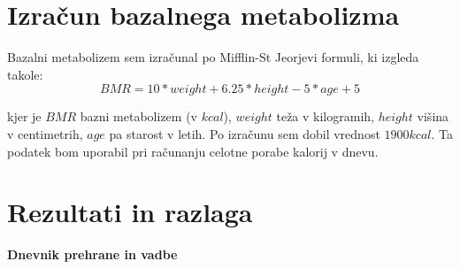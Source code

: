 \documentclass{article}
\begin{document}
\section{Izračun bazalnega metabolizma}
Bazalni metabolizem sem izračunal po Mifflin-St Jeorjevi formuli, ki izgleda takole:
\[
BMR = 10 * weight + 6.25 * height - 5 * age + 5 
\]

kjer je $BMR$ bazni metabolizem (v $kcal$), $weight$ teža v kilogramih, $height$ višina v centimetrih, $age$ pa starost v letih. Po izračunu sem dobil vrednost $1900 kcal$. Ta podatek bom uporabil pri računanju celotne porabe kalorij v dnevu. 

\section{Rezultati in razlaga}

\textbf{\Large Dnevnik prehrane in vadbe}

\vspace{0.5cm}
\end{document}
